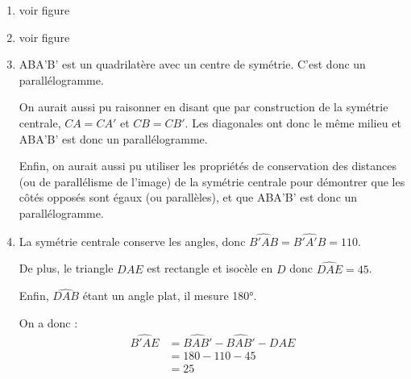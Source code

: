 \begin{enumerate}
    \item {} voir figure 
    \item {} voir figure
\begin{figure}[H]
    \center
\end{figure}

    \item {} ABA'B' est un quadrilatère avec un centre de symétrie. C'est donc un parallélogramme.
    
    On aurait aussi pu raisonner en disant que par construction de la symétrie centrale, $CA=CA'$ et $CB=CB'$. Les diagonales ont donc le même milieu et ABA'B' est donc un parallélogramme.

    Enfin, on aurait aussi pu utiliser les propriétés de conservation des distances (ou de parallélisme de l'image) de la symétrie centrale pour démontrer que les côtés opposés sont égaux (ou parallèles), et que ABA'B' est donc un parallélogramme.

    \item {} 
    La symétrie centrale conserve les angles, donc $\widehat{B'AB}=\widehat{B'A'B}=110$.

    De plus, le triangle $DAE$ est rectangle et isocèle en $D$ donc $\widehat{DAE}=45$.

    Enfin, $\widehat{DAB}$ étant un angle plat, il mesure 180°.

    On a donc : \begin{align*}
    \widehat{B'AE}&=\widehat{BAB'}-\widehat{BAB'}-\widehat{DAE}\\
    &=180-110-45\\
    &=25
    \end{align*}
\end{enumerate}